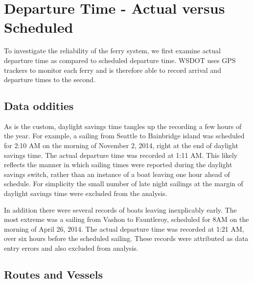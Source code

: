 \documentclass[11pt, letterpaper]{article}
\begin{document}
\section*{Departure Time - Actual versus Scheduled}

To investigate the reliability of the ferry system, we first examine actual departure time as compared to scheduled departure time. WSDOT uses GPS trackers to monitor each ferry and is therefore able to record arrival and departure times to the second. 

\subsection*{Data oddities}

As is the custom, daylight savings time tangles up the recording a few hours of the year. For example, a sailing from Seattle to Bainbridge island was scheduled for 2:10 AM on the morning of November 2, 2014, right at the end of daylight savings time. The actual departure time was recorded at 1:11 AM. This likely reflects the manner in which sailing times were reported during the daylight savings switch, rather than an instance of a boat leaving one hour ahead of schedule. For simplicity the small number of late night sailings at the margin of daylight savings time were excluded from the analysis.

In addition there were several records of boats leaving inexplicably early. The most extreme was a sailing from Vashon to Fauntleroy, scheduled for 8AM on the morning of April 26, 2014. The actual departure time was recorded at 1:21 AM, over six hours before the scheduled sailing.  These records were attributed as data entry errors and also excluded from analysis.


\subsection*{Routes and Vessels}
\end{document}
